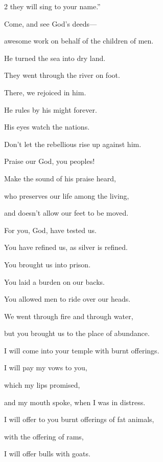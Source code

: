 \begin{multicols}{2}
	they will sing to your name.”
	
	\vspace{\baselineskip}	
	
	
	\myverse{}Come, and see God’s deeds---
	
	awesome work on behalf of the children of men.
	
	
	\myverse{}He turned the sea into dry land.
	
	They went through the river on foot.
	
	There, we rejoiced in him.
	
	
	\myverse{}He rules by his might forever.
	
	His eyes watch the nations.
	
	Don’t let the rebellious rise up against him.
	
	\vspace{\baselineskip}	
	
	
	\myverse{}Praise our God, you peoples!
	
	Make the sound of his praise heard,
	
	
	\myverse{}who preserves our life among the living,
	
	and doesn’t allow our feet to be moved.
	
	
	\myverse{}For you, God, have tested us.
	
	You have refined us, as silver is refined.
	
	
	\myverse{}You brought us into prison.
	
	You laid a burden on our backs.
	
	
	\myverse{}You allowed men to ride over our heads.
	
	We went through fire and through water,
	
	but you brought us to the place of abundance.
	
	
	\myverse{}I will come into your temple with burnt offerings.
	
	I will pay my vows to you,
	
	\myverse{}which my lips promised,
	
	and my mouth spoke, when I was in distress.
	
	
	\myverse{}I will offer to you burnt offerings of fat animals,
	
	with the offering of rams,
	
	I will offer bulls with goats.
	
	\vspace{\baselineskip}	
	

\end{multicols}
